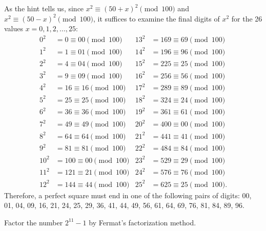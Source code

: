 \begin{solution}
    As the hint tells us, since $x^2 \equiv (50 + x)^2 \pmod{100}$ and $x^2 \equiv (50 - x)^2 \pmod{100}$, it suffices to examine the final digits of $x^2$ for the 26 values $x = 0,1,2,...,25$:
    \begin{align*}
        0^2 &= 0 \equiv 00 \pmod{100} & 13^2 &= 169 \equiv 69 \pmod{100} \\
        1^2 &= 1 \equiv 01 \pmod{100} & 14^2 &= 196 \equiv 96 \pmod{100} \\
        2^2 &= 4 \equiv 04 \pmod{100} & 15^2 &= 225 \equiv 25 \pmod{100} \\
        3^2 &= 9 \equiv 09 \pmod{100} & 16^2 &= 256 \equiv 56 \pmod{100} \\
        4^2 &= 16 \equiv 16 \pmod{100} & 17^2 &= 289 \equiv 89 \pmod{100} \\
        5^2 &= 25 \equiv 25 \pmod{100} & 18^2 &= 324 \equiv 24 \pmod{100} \\
        6^2 &= 36 \equiv 36 \pmod{100} & 19^2 &= 361 \equiv 61 \pmod{100} \\
        7^2 &= 49 \equiv 49 \pmod{100} & 20^2 &= 400 \equiv 00 \pmod{100} \\
        8^2 &= 64 \equiv 64 \pmod{100} & 21^2 &= 441 \equiv 41 \pmod{100} \\
        9^2 &= 81 \equiv 81 \pmod{100} & 22^2 &= 484 \equiv 84 \pmod{100} \\
        10^2 &= 100 \equiv 00 \pmod{100} & 23^2 &= 529 \equiv 29 \pmod{100} \\
        11^2 &= 121 \equiv 21 \pmod{100} & 24^2 &= 576 \equiv 76 \pmod{100} \\
        12^2 &= 144 \equiv 44 \pmod{100} & 25^2 &= 625 \equiv 25 \pmod{100}.
    \end{align*}
    Therefore, a  perfect square must end in one of the following pairs of digits: 00, 01, 04, 09, 16, 21, 24, 25, 29, 36, 41, 44, 49, 56, 61, 64, 69, 76, 81, 84, 89, 96. \\
\end{solution}

\begin{exercise}
    Factor the number $2^{11} - 1$ by Fermat's factorization method. \\
\end{exercise}

